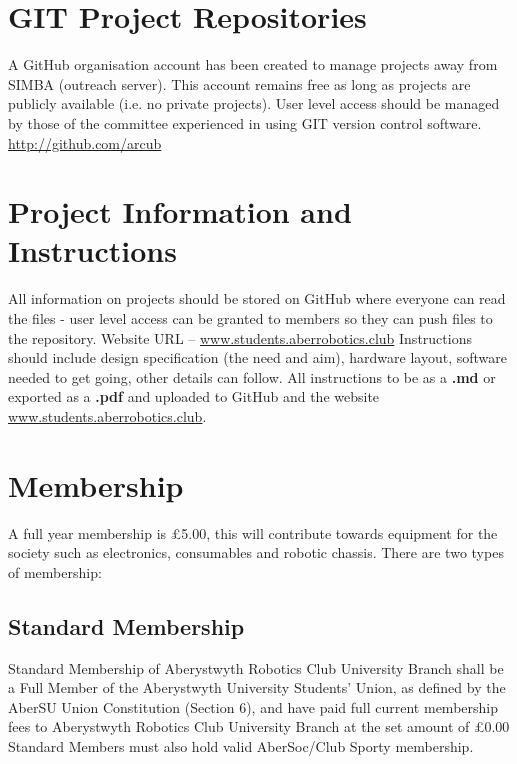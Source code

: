\documentclass[a4paper,11pt]{article}
\begin{document}
\section{GIT Project Repositories}
A GitHub organisation account has been created to manage projects away from SIMBA (outreach server). This account remains free as long as projects are publicly available (i.e. no private projects). User level access should be managed by those of the committee experienced in using GIT version control software.\newline
\url{http://github.com/arcub}

\section{Project Information and Instructions}
All information on projects should be stored on GitHub where everyone can read the files - user level access can be granted to members so they can push files to the repository.\newline
Website URL – \url{www.students.aberrobotics.club}
Instructions should include design specification (the need and aim), hardware layout, software needed to get going, other details can follow.\newline
All instructions to be as a \textbf{.md} or exported as a \textbf{.pdf} and uploaded to GitHub and the website \url{www.students.aberrobotics.club}.

\section{Membership}
A full year membership is £5.00, this will contribute towards equipment for the society such as electronics, consumables and robotic chassis.
There are two types of membership:

\subsection{Standard Membership}
Standard Membership of Aberystwyth Robotics Club University Branch shall be a Full Member of the Aberystwyth University Students’ Union, as defined by the AberSU Union Constitution (Section 6), and have paid full current membership fees to Aberystwyth Robotics Club University Branch at the set amount of £0.00 Standard Members must also hold valid AberSoc/Club Sporty membership.

\newpage
\end{document}
